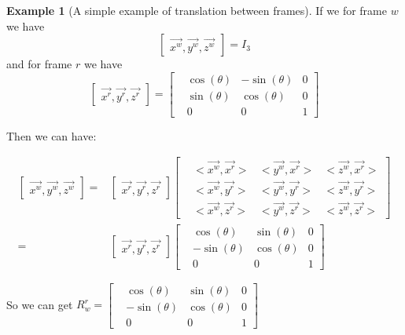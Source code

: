 \documentclass[
]{book}
\theoremstyle{definition}
\theoremstyle{definition}
\newtheorem{example}{Example}[chapter]
\theoremstyle{definition}
\theoremstyle{definition}
\theoremstyle{remark}
\begin{document}
\begin{example}[A simple example of translation between frames]
\protect\hypertarget{exm:frametransexample}{}\label{exm:frametransexample}If we for frame \(w\) we have \[\begin{bmatrix}
    \vec{x^w},\vec{y^w},\vec{z^w}
\end{bmatrix} = I_3\]
and for frame \(r\) we have \[\begin{bmatrix}
    \vec{x^r},\vec{y^r},\vec{z^r}
\end{bmatrix} = \begin{bmatrix}
    &\cos(\theta) &-\sin(\theta) &0\\
    &\sin(\theta) &\cos(\theta)  &0\\
    &0            &0             &1
\end{bmatrix}\]

Then we can have:

\begin{align}
\begin{bmatrix}
    \vec{x^w},\vec{y^w},\vec{z^w}
\end{bmatrix} =& \begin{bmatrix}
    \vec{x^r},\vec{y^r},\vec{z^r}
\end{bmatrix}\begin{bmatrix}
    &<\vec{x^w},\vec{x^r}> &<\vec{y^w},\vec{x^r}> &<\vec{z^w},\vec{x^r}>\\
    &<\vec{x^w},\vec{y^r}> &<\vec{y^w},\vec{y^r}> &<\vec{z^w},\vec{y^r}>\\
    &<\vec{x^w},\vec{z^r}> &<\vec{y^w},\vec{z^r}> &<\vec{z^w},\vec{z^r}>
\end{bmatrix} \\
  =& \begin{bmatrix}
    \vec{x^r},\vec{y^r},\vec{z^r}
\end{bmatrix}\begin{bmatrix}
    &\cos(\theta) &\sin(\theta) &0\\
    &-\sin(\theta) &\cos(\theta) &0\\
    &0 &0 &1
\end{bmatrix}
  \end{align}

So we can get \(R_w^r = \begin{bmatrix}  &\cos(\theta) &\sin(\theta) &0\\  &-\sin(\theta) &\cos(\theta) &0\\  &0 &0 &1 \end{bmatrix}\)
\end{example}
\end{document}
